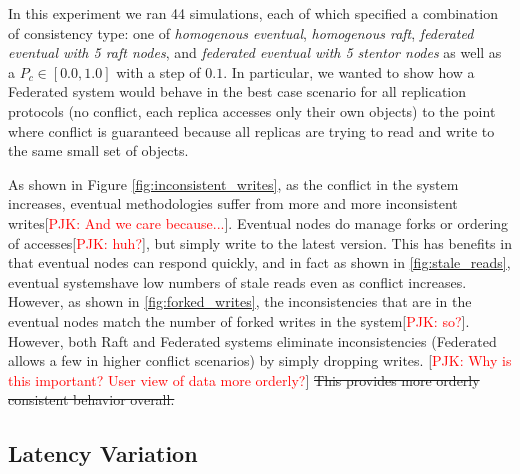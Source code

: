 \documentclass[10pt,conference,compsocconf,letterpaper]{IEEEtran}
\newcommand{\todo}[1]{{\textcolor{red}{#1}}}
\newcommand{\pjk}[1]{[\todo{PJK: #1}]}
\begin{document}
In this experiment we ran 44 simulations, each of which specified a combination of consistency type: one of \textit{homogenous eventual}, \textit{homogenous raft}, \textit{federated eventual with 5 raft nodes}, and \textit{federated eventual with 5 stentor nodes} as well as a $P_c \in [0.0,1.0]$ with a step of $0.1$. In particular, we wanted to show how a Federated system would behave in the best case scenario for all replication protocols (no conflict, each replica accesses only their own objects) to the point where conflict is guaranteed because all replicas are trying to read and write to the same small set of objects.

As shown in Figure \ref{fig:inconsistent_writes}, as the conflict in the system increases, eventual methodologies suffer from more and more inconsistent writes\pjk{And we care because...}. Eventual nodes do manage forks or ordering of accesses\pjk{huh?}, but simply write to the latest version. This has benefits in that eventual nodes can respond quickly, and in fact as shown in \ref{fig:stale_reads}, eventual systemshave low numbers of stale reads even as conflict increases. However, as shown in \ref{fig:forked_writes}, the inconsistencies that are in the eventual nodes match the number of forked writes in the system\pjk{so?}. However, both Raft and Federated systems eliminate inconsistencies (Federated allows a few in higher conflict scenarios) by simply dropping writes. \pjk{Why is this important? User view of data more orderly?} \st{This provides more orderly consistent behavior overall.}

\subsection{Latency Variation}
\end{document}

